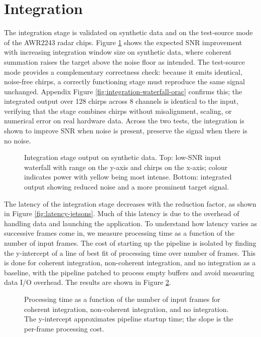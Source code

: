 
\FloatBarrier
\section{Integration}
The integration stage is validated on synthetic data and on the test-source mode of the 
AWR2243 radar chips. Figure \ref{fig:integration-waterfall} shows the expected SNR 
improvement with increasing integration window size on synthetic data, where coherent 
summation raises the target above the noise floor as intended. The test-source mode 
provides a complementary correctness check: because it emits identical, noise-free 
chirps, a correctly functioning stage must reproduce the same signal unchanged. 
Appendix Figure \ref{fig:integration-waterfall-orac} confirms this; the integrated 
output over 128 chirps across 8 channels is identical to the input, verifying that the 
stage combines chirps without misalignment, scaling, or numerical error on real 
hardware data. Across the two tests, the integration is shown to improve SNR 
when noise is present, preserve the signal when there is no noise.

\begin{figure}
    \caption[Integration on synthetic data showing SNR improvement.]{Integration stage
    output on synthetic data. Top: low-SNR input waterfall with range on the y-axis and
    chirps on the x-axis; colour indicates power with yellow being most intense. Bottom:
    integrated output showing reduced noise and a more prominent target signal.}
    \label{fig:integration-waterfall}
\end{figure}

The latency of the integration stage decreases with the reduction factor, as shown in
Figure \ref{fig:latency-jetsons}. Much of this latency is due to the overhead
of handling data and launching the application. To understand how latency varies 
as successive frames come in, we measure processing time as a function of the number of 
input frames. The cost of starting up the pipeline is isolated by finding the y-intercept 
of a line of best fit of processing time over number of frames. This is
done for coherent integration, non-coherent integration, and no integration as a baseline,
with the pipeline patched to process empty buffers and avoid measuring data I/O overhead.
The results are shown in Figure \ref{fig:integration-latency-per-frame}.

\begin{figure}
    \caption[Integration stage latency per frame.]{Processing time as a function of the
    number of input frames for coherent integration, non-coherent integration, and no
    integration. The y-intercept approximates pipeline startup time; the slope is the
    per-frame processing cost.}
    \label{fig:integration-latency-per-frame}
\end{figure}

